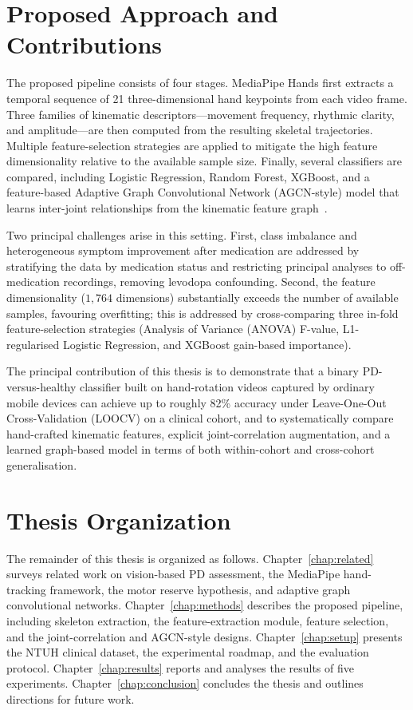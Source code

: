 \section{Proposed Approach and Contributions}
\label{sec:contributions}

The proposed pipeline consists of four stages. MediaPipe Hands first extracts a temporal sequence of 21 three-dimensional hand keypoints from each video frame. Three families of kinematic descriptors---movement frequency, rhythmic clarity, and amplitude---are then computed from the resulting skeletal trajectories. Multiple feature-selection strategies are applied to mitigate the high feature dimensionality relative to the available sample size. Finally, several classifiers are compared, including Logistic Regression, Random Forest, XGBoost, and a feature-based Adaptive Graph Convolutional Network (AGCN-style) model that learns inter-joint relationships from the kinematic feature graph~\cite{xie2024clinically}.

Two principal challenges arise in this setting. First, class imbalance and heterogeneous symptom improvement after medication are addressed by stratifying the data by medication status and restricting principal analyses to off-medication recordings, removing levodopa confounding. Second, the feature dimensionality ($1{,}764$ dimensions) substantially exceeds the number of available samples, favouring overfitting; this is addressed by cross-comparing three in-fold feature-selection strategies (Analysis of Variance (ANOVA) F-value, L1-regularised Logistic Regression, and XGBoost gain-based importance).

The principal contribution of this thesis is to demonstrate that a binary PD-versus-healthy classifier built on hand-rotation videos captured by ordinary mobile devices can achieve up to roughly 82\% accuracy under Leave-One-Out Cross-Validation (LOOCV) on a clinical cohort, and to systematically compare hand-crafted kinematic features, explicit joint-correlation augmentation, and a learned graph-based model in terms of both within-cohort and cross-cohort generalisation.

\section{Thesis Organization}
\label{sec:organization}

The remainder of this thesis is organized as follows. Chapter~\ref{chap:related} surveys related work on vision-based PD assessment, the MediaPipe hand-tracking framework, the motor reserve hypothesis, and adaptive graph convolutional networks. Chapter~\ref{chap:methods} describes the proposed pipeline, including skeleton extraction, the feature-extraction module, feature selection, and the joint-correlation and AGCN-style designs. Chapter~\ref{chap:setup} presents the NTUH clinical dataset, the experimental roadmap, and the evaluation protocol. Chapter~\ref{chap:results} reports and analyses the results of five experiments. Chapter~\ref{chap:conclusion} concludes the thesis and outlines directions for future work.

